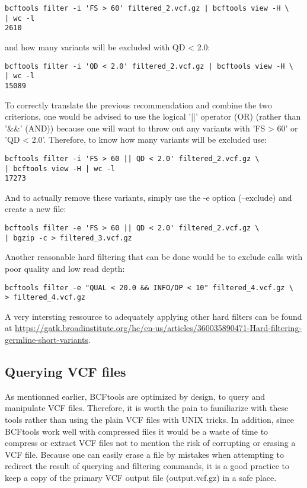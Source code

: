 \begin{verbatim}
bcftools filter -i 'FS > 60' filtered_2.vcf.gz | bcftools view -H \
| wc -l
2610
\end{verbatim}

and how many variants will be excluded with QD < 2.0:

\begin{verbatim}
bcftools filter -i 'QD < 2.0' filtered_2.vcf.gz | bcftools view -H \
| wc -l
15089
\end{verbatim}


To correctly translate the previous recommendation and combine the two criterions, one would be advised to use the logical '||' operator (OR) (rather than '\&\&' (AND)) because one will want to throw out any variants with 'FS > 60' or 'QD < 2.0'. Therefore, to know how many variants will be excluded use: 

\begin{verbatim}
bcftools filter -i 'FS > 60 || QD < 2.0' filtered_2.vcf.gz \
| bcftools view -H | wc -l
17273
\end{verbatim}

And to actually remove these variants, simply use the -e option (--exclude) and create a new file:

\begin{verbatim}
bcftools filter -e 'FS > 60 || QD < 2.0' filtered_2.vcf.gz \
| bgzip -c > filtered_3.vcf.gz
\end{verbatim}

Another reasonable hard filtering that can be done would be to exclude calls with poor quality and low read depth:

\begin{verbatim}
bcftools filter -e "QUAL < 20.0 && INFO/DP < 10" filtered_4.vcf.gz \
> filtered_4.vcf.gz
\end{verbatim}

A very intersting ressource to adequately applying other hard filters can be found at \href{https://gatk.broadinstitute.org/hc/en-us/articles/360035890471-Hard-filtering-germline-short-variants}{https://gatk.broadinstitute.org/hc/en-us/articles/360035890471-Hard-filtering-germline-short-variants}.


\subsection{Querying VCF files}


As mentionned earlier, BCFtools are optimized by design, to query and manipulate VCF files. Therefore, it is worth the pain to familiarize with these tools rather than using the plain VCF files with UNIX tricks. In addition, since BCFtools work well with compressed files it would be a waste of time to compress or extract VCF files not to mention the risk of corrupting or erasing a VCF file. Because one can easily erase a file by mistakes when attempting to redirect the result of querying and filtering commands, it is a good practice to keep a copy of the primary VCF output file (output.vcf.gz) in a safe place.

